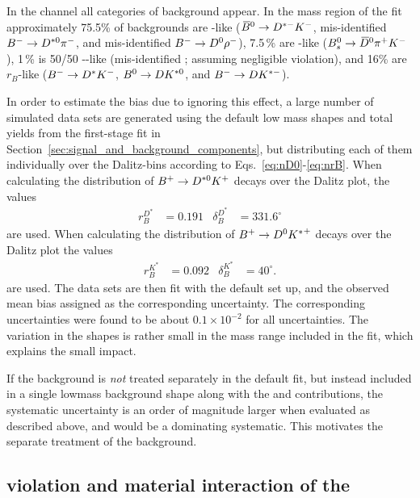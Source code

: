 In the \D\kaon channel all categories of background appear. In the mass region of the \CP fit approximately 75.5\% of backgrounds are \Dz-like (${{\kern 0.18em\overline{\kern -0.18em B}}{}^0}\rightarrow{\ensuremath{{D}^{*-}}}{\ensuremath{{K}^-}}$, mis-identified ${{{B}^-}}\rightarrow{\ensuremath{{D}^{*0}}}{\ensuremath{{\pi}^-}}$, and mis-identified ${{{B}^-}}\rightarrow{\ensuremath{{D}^0}}\rho^-$), 7.5\,\% are \Dzb-like (${{{B}^0_{s}}\rightarrow{\ensuremath{{\kern 0.18em\overline{\kern -0.18em D}}{}^0}}\pi^+{{K}^-}}$), 1\,\% is 50/50 \Dz-\Dzb-like (mis-identified \Bz\to\D\rhoz; assuming negligible \CP violation), and 16\% are $r_B$-like (${{{B}^-}}\rightarrow{\ensuremath{{D}^*}}{\ensuremath{{K}^-}}$, ${{B}^0}\rightarrow{\ensuremath{D}}{\ensuremath{{K}^{*0}}}$, and ${{{B}^-}}\rightarrow{\ensuremath{D}}{\ensuremath{{K}^{*-}}}$). 

In order to estimate the bias due to ignoring this effect, a large number of simulated data sets are generated using the default low mass shapes and total yields from the first-stage fit in Section~\ref{sec:signal_and_background_components}, but distributing each of them individually over the Dalitz-bins according to Eqs.~\eqref{eq:nD0}-\eqref{eq:nrB}. When calculating the distribution of ${{{B}^+}}\rightarrow{\ensuremath{{D}^{*0}}}{\ensuremath{{K}^+}}$ decays over the Dalitz plot, the values \cite{LHCb-CONF-2018-002}
\begin{align}
    r_B^{D^*} & = 0.191 & \delta_B^{D^*} & = 331.6^\circ
\end{align} are used.  When calculating the distribution of ${{{B}^+}}\rightarrow{\ensuremath{{D}^0}}{\ensuremath{{K}^*}}^+$ decays over the Dalitz plot the values \cite{LHCb-CONF-2018-002}
\begin{align}
        r_B^{K^*} & = 0.092 & \delta_B^{K^*} & = 40^\circ.
\end{align}  are used. The data sets are then fit with the default set up, and the observed mean bias assigned as the corresponding uncertainty. The corresponding uncertainties were found to be about $0.1\times 10^{-2}$ for all uncertainties. The variation in the shapes is rather small in the mass range included in the fit, which explains the small impact.

If the \Bs background is \emph{not} treated separately in the default fit, but instead included in a single lowmass background shape along with the \Bz and \Bpm contributions, the systematic uncertainty is an order of magnitude larger when evaluated as described above, and would be a dominating systematic. This motivates the separate treatment of the \Bs background.




\subsection{\texorpdfstring{\CP violation and material interaction of the \KS}
{CP violation and material interaction of the KS}} %
\label{sub:cp_violation_and_material_interaction_of_the_ks}


